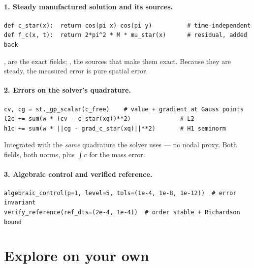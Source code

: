 \paragraph{1. Steady manufactured solution and its sources.}
\begin{lstlisting}
def c_star(x):  return cos(pi x) cos(pi y)          # time-independent
def f_c(x, t):  return 2*pi^2 * M * mu_star(x)      # residual, added back
\end{lstlisting}
,  are the exact fields; ,
 the sources that make them exact. Because they are steady, the
measured error is pure spatial error.

\paragraph{2. Errors on the solver's quadrature.}
\begin{lstlisting}
cv, cg = st._gp_scalar(c_free)    # value + gradient at Gauss points
l2c += sum(w * (cv - c_star(xq))**2)              # L2
h1c += sum(w * ||cg - grad_c_star(xq)||**2)       # H1 seminorm
\end{lstlisting}
Integrated with the \emph{same} quadrature the solver uses --- no nodal
proxy. Both fields, both norms, plus $\int c$ for the mass error.

\paragraph{3. Algebraic control and verified reference.}
\begin{lstlisting}
algebraic_control(p=1, level=5, tols=(1e-4, 1e-8, 1e-12))  # error invariant
verify_reference(ref_dts=(2e-4, 1e-4))  # order stable + Richardson bound
\end{lstlisting}

\section{Explore on your own}




